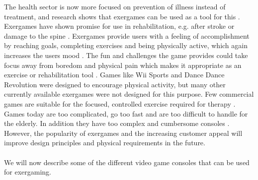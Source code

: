 The health sector is now more focused on prevention of illness instead of treatment, and research shows that exergames can be used as a tool for this  \cite{gamingforhealth}. Exergames have shown promise for use in rehabilitation, e.g. after stroke or damage to the spine \cite{lange2011development}. Exergames provide users with a feeling of accomplishment by reaching goals, completing exercises and being physically active, which again increases the users mood \cite{staiano2011exergames}. The fun and challenges the game provides could take focus away from boredom and physical pain which makes it appropriate as an exercise or rehabilitation tool \cite{roleofvideogames} \cite{exergamesforelderly}. Games like Wii Sports and Dance Dance Revolution were designed to encourage physical activity, but many other currently available exergames were not designed for this purpose. Few commercial games are suitable for the focused, controlled exercise required for therapy \cite{lange2011development}. Games today are too complicated, go too fast and are too difficult to handle for the elderly. In addition they have too complex and cumbersome consoles \cite{exergamesforelderly}. However, the popularity of exergames and the increasing customer appeal will improve design principles and physical requirements in the future\cite{chamberlin2008exergames}. \\ \\
We will now describe some of the different video game consoles that can be used for exergaming.
